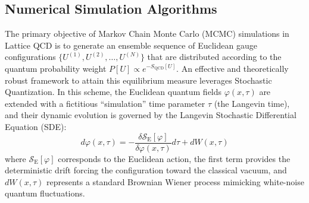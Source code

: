 \subsection{Numerical Simulation Algorithms}
The primary objective of Markov Chain Monte Carlo (MCMC) simulations in Lattice QCD is to generate an ensemble sequence of Euclidean gauge configurations $\{U^{(1)}, U^{(2)}, \dots, U^{(N)}\}$ that are distributed according to the quantum probability weight $P[U] \propto  e^{-S_{\mathrm{QCD}}[U]}$. An effective and theoretically robust framework to attain this equilibrium measure leverages Stochastic Quantization. In this scheme, the Euclidean quantum fields $\varphi(x, \tau)$ are extended with a fictitious ``simulation'' time parameter $\tau$ (the Langevin time), and their dynamic evolution is governed by the Langevin Stochastic Differential Equation (SDE):
\begin{equation}
d\varphi(x, \tau) = - \frac{\delta \mathcal{S}_{\mathrm{E}}[\varphi]}{\delta \varphi(x, \tau)} d\tau + dW(x, \tau)
\label{eq:langevin_sde_differential}
\end{equation}
where $\mathcal{S}_{\mathrm{E}}[\varphi]$ corresponds to the Euclidean action, the first term provides the deterministic drift forcing the configuration toward the classical vacuum, and $dW(x, \tau)$ represents a standard Brownian Wiener process mimicking white-noise quantum fluctuations.

